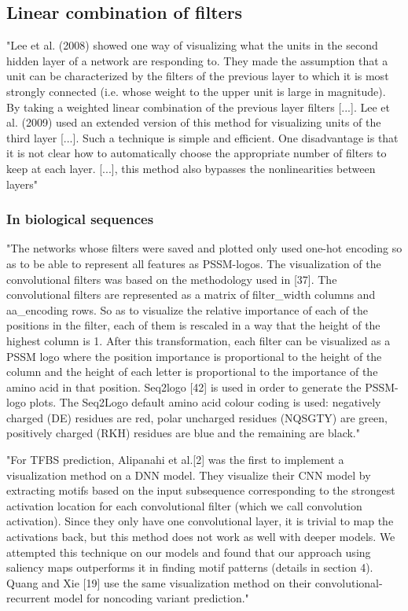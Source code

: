 \documentclass[]{scrartcl}
\begin{document}
\subsection{Linear combination of filters}
"Lee et al. (2008) showed one way of visualizing what the units in the second hidden layer of a network are responding to. They made the assumption that a unit can be characterized by the filters of the previous layer to which it is most strongly connected (i.e. whose weight to the upper unit is large in magnitude). By taking a weighted linear combination of the previous layer filters [...].
Lee et al. (2009) used an extended version of this method for visualizing units of the third layer [...].
Such a technique is simple and efficient. One disadvantage is that it is not clear how to automatically choose the appropriate number of filters to keep at each layer. [...], this method also bypasses the nonlinearities between layers" \cite{Erhan2009}
\subsubsection{In biological sequences}
"The networks whose filters were saved and plotted only used one-hot encoding so as to be able to represent all features as PSSM-logos. The visualization of the convolutional filters was based on the methodology used in [37]. The convolutional filters are represented as a matrix of filter\_width columns and aa\_encoding rows. So as to visualize the relative importance of each of the positions in the filter, each of them is rescaled in a way that the height of the highest column is 1. After this transformation, each filter can be visualized as a PSSM logo where the position importance is proportional to the height of the column and the height of each letter is proportional to the importance of the amino acid in that position. Seq2logo [42] is used in order to generate the PSSM-logo plots. The Seq2Logo default amino acid colour coding is used: negatively charged (DE) residues are red, polar uncharged residues (NQSGTY) are green, positively charged (RKH) residues are blue and the remaining are black." \cite{Fontal2017}

"For TFBS prediction, Alipanahi et al.[2] was the first to implement a visualization method on a DNN model. They visualize their CNN model by extracting motifs based on the input subsequence corresponding to the strongest activation location for each convolutional filter (which we call convolution activation). Since they only have one convolutional layer, it is trivial to map the activations back, but this method does not work as well with deeper models. We attempted this technique on our models and found that our approach using saliency maps outperforms it in finding motif patterns (details in section 4). Quang and Xie [19] use the same visualization method on their convolutional-recurrent model for noncoding variant prediction." \cite{Lanchantin2016}
\end{document}
